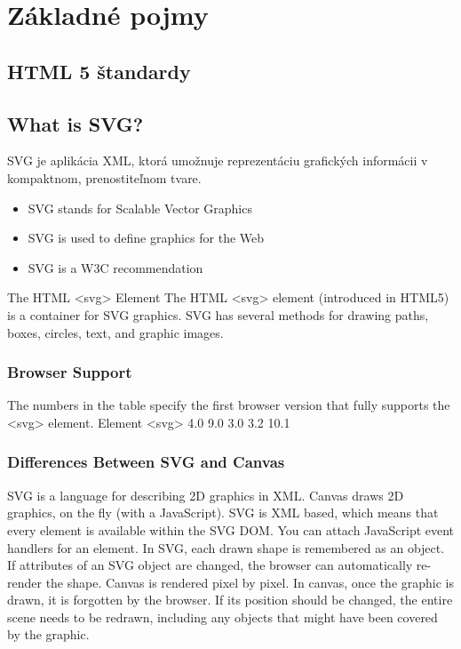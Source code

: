\chapter{Základné pojmy}




\section{HTML 5 štandardy}



\section{What is SVG?}
\ac{SVG}  je aplikácia XML, ktorá umožnuje reprezentáciu grafických informácii v kompaktnom, prenostiteľnom tvare. 

\begin{itemize}
\item	SVG stands for Scalable Vector Graphics
\item	SVG is used to define graphics for the Web
\item	SVG is a W3C recommendation
\end{itemize}
The HTML <svg> Element
The HTML <svg> element (introduced in HTML5) is a container for SVG graphics.
SVG has several methods for drawing paths, boxes, circles, text, and graphic images.
\subsection{Browser Support}
The numbers in the table specify the first browser version that fully supports the <svg> element.
Element					
<svg>	4.0	9.0	3.0	3.2	10.1
\subsection{Differences Between SVG and Canvas}
SVG is a language for describing 2D graphics in XML.
Canvas draws 2D graphics, on the fly (with a JavaScript).
SVG is XML based, which means that every element is available within the SVG DOM. You can attach JavaScript event handlers for an element.
In SVG, each drawn shape is remembered as an object. If attributes of an SVG object are changed, the browser can automatically re-render the shape.
Canvas is rendered pixel by pixel. In canvas, once the graphic is drawn, it is forgotten by the browser. If its position should be changed, the entire scene needs to be redrawn, including any objects that might have been covered by the graphic.


